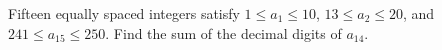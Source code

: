 Fifteen equally spaced integers satisfy $1\le a_1\le10$, $13\le a_2\le20$, and $241\le a_{15}\le250$. Find the sum of the decimal digits of $a_{14}$.
